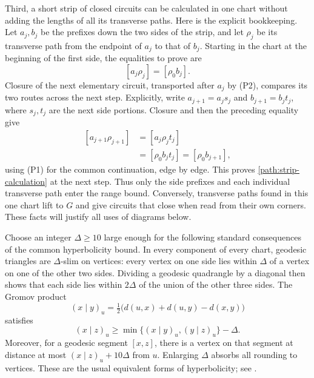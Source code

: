 Third, a short strip of closed circuits can be calculated in one chart
without adding the lengths of all its transverse paths.  Here is the
explicit bookkeeping.  Let $a_j,b_j$ be the prefixes down the two sides
of the strip, and let $\rho_j$ be its transverse path from the endpoint
of $a_j$ to that of $b_j$.  Starting in the chart at the beginning of the
first side, the equalities to prove are
\begin{equation}\label{path:strip-calculation}
 [a_j\rho_j]=[\rho_0b_j].
\end{equation}
Closure of the next elementary circuit, transported after $a_j$ by (P2),
compares its two routes across the next step.  Explicitly, write
$a_{j+1}=a_js_j$ and $b_{j+1}=b_jt_j$, where $s_j,t_j$ are the next
side portions.  Closure and then the preceding equality give
\[
 \begin{aligned}
 [a_{j+1}\rho_{j+1}]&=[a_j\rho_jt_j]\\
                    &=[\rho_0b_jt_j]=[\rho_0b_{j+1}],
 \end{aligned}
\]
using (P1) for the common continuation, edge by edge.  This proves
\eqref{path:strip-calculation} at the next step.  Thus only the side
prefixes and each individual transverse path enter the range bound.
Conversely, transverse paths found in this one chart lift to $G$ and
give circuits that close when read from their own corners.  These facts
will justify all uses of diagrams below.

Choose an integer $\Delta\ge10$ large enough for the following standard
consequences of the common hyperbolicity bound.  In every component of
every chart, geodesic triangles are $\Delta$-slim on vertices: every
vertex on one side lies within $\Delta$ of a vertex on one of the other
two sides.  Dividing a geodesic quadrangle by a diagonal then shows that
each side lies within $2\Delta$ of the union of the other three sides.
The Gromov product
\[
 (x\mid y)_u=\tfrac12\bigl(d(u,x)+d(u,y)-d(x,y)\bigr)
\]
satisfies
\begin{equation}\label{path:product}
 (x\mid z)_u\ge
 \min\{(x\mid y)_u,(y\mid z)_u\}-\Delta.
\end{equation}
Moreover, for a geodesic segment $[x,z]$, there is a vertex on that segment
at distance at most $(x\mid z)_u+10\Delta$ from $u$.  Enlarging $\Delta$
absorbs all rounding to vertices.  These are the usual equivalent forms
of hyperbolicity; see \cite[Chapter III.H]{BridsonHaefliger}.

